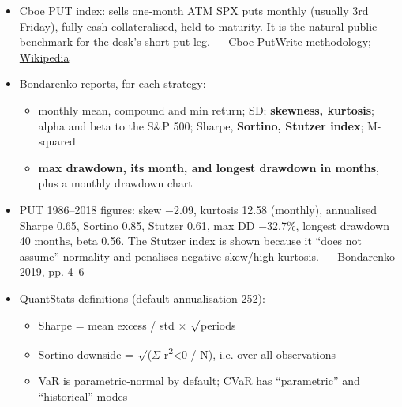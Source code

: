 \documentclass{article}
\begin{document}
\begin{itemize}

\item Cboe PUT index: sells one-month ATM SPX puts monthly (usually 3rd Friday), fully cash-collateralised, held to maturity. It is the natural public benchmark for the desk's short-put leg. --- \href{https://cdn.cboe.com/api/global/us_indices/governance/Cboe_SP_500_PutWrite_Indices_Methodology.pdf}{Cboe PutWrite methodology}; \href{https://en.wikipedia.org/wiki/CBOE_S\&P_500_PutWrite_Index}{Wikipedia}

\item Bondarenko reports, for each strategy:

\begin{itemize}

\item monthly mean, compound and min return; SD; \textbf{skewness, kurtosis}; alpha and beta to the S\&P 500; Sharpe, \textbf{Sortino, Stutzer index}; M-squared

\item \textbf{max drawdown, its month, and longest drawdown in months}, plus a monthly drawdown chart

\end{itemize}

\item PUT 1986--2018 figures: skew \ensuremath{-}2.09, kurtosis 12.58 (monthly), annualised Sharpe 0.65, Sortino 0.85, Stutzer 0.61, max DD \ensuremath{-}32.7\%, longest drawdown 40 months, beta 0.56. The Stutzer index is shown because it ``does not assume'' normality and penalises negative skew/\allowbreak{}high kurtosis. --- \href{https://cdn.cboe.com/resources/education/research_publications/PutWriteCBOE19_v14_by_Prof_Oleg_Bondarenko_as_of_June_14.pdf}{Bondarenko 2019, pp. 4--6}

\item QuantStats definitions (default annualisation 252):

\begin{itemize}

\item Sharpe = mean excess /\allowbreak{} std \ensuremath{\times} \ensuremath{\surd}periods

\item Sortino downside = \ensuremath{\surd}(\ensuremath{\Sigma} r\textsuperscript{2}<0 /\allowbreak{} N), i.e. over all observations

\item VaR is parametric-normal by default; CVaR has ``parametric'' and ``historical'' modes


\end{itemize}
\end{itemize}
\end{document}
